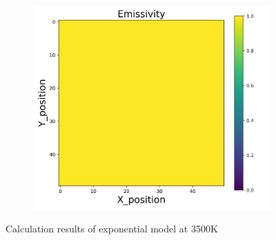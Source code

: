 \begin{figure}[htbp]
\begin{minipage}{\textwidth}
\begin{subfigure}{0.325\textwidth}
        \end{subfigure}
        \begin{subfigure}{0.325\textwidth}
            \centering
            \includegraphics[width=\textwidth]{figures/raw_data/5/T3500/exp/emi_cal.jpg}
        \end{subfigure}
    \end{minipage}
    \caption{Calculation results of exponential model at 3500K}
    \label{fig: result_exp_model_3500}
\end{figure}


